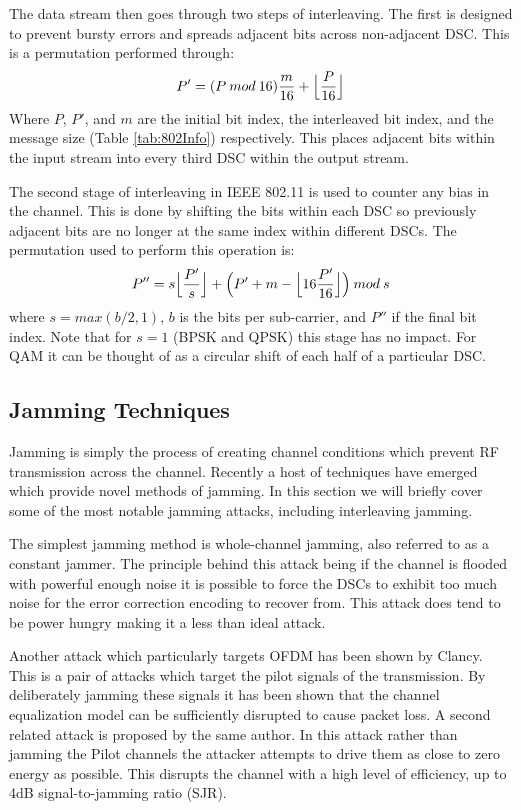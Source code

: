 \documentclass[sigconf]{acmart}
\begin{document}
The data stream then goes through two steps of interleaving. The first is designed to prevent bursty errors and spreads adjacent bits across non-adjacent DSC. This is a permutation performed through:
$$P'=(P\:mod\:16)\frac{m}{16} + \Bigl\lfloor{\frac{P}{16}}\Bigr\rfloor$$
Where $P$, $P'$, and $m$ are the initial bit index, the interleaved bit index, and the message size (Table \ref{tab:802Info}) respectively. This places adjacent bits within the input stream into every third DSC within the output stream\cite{vo2016interleaving}. 

The second stage of interleaving in IEEE 802.11 is used to counter any bias in the channel. This is done by shifting the bits within each DSC so previously adjacent bits are no longer at the same index within different DSCs. The permutation used to perform this operation is:
$$P''= s \Bigl\lfloor \frac{P'}{s} \Bigr\rfloor + \Bigl(P' + m - \Bigl\lfloor 16 \frac{P'}{16} \Bigr\rfloor \Bigr)\: mod \: s$$
where $s=max(b/2, 1)$, $b$ is the bits per sub-carrier, and $P''$ if the final bit index. Note that for $s=1$ (BPSK and QPSK) this stage has no impact. For QAM it can be thought of as a circular shift of each half of a particular DSC. 

\subsection{Jamming Techniques}
\label{sec:jamming}

Jamming is simply the process of creating channel conditions which prevent RF transmission across the channel. Recently a host of techniques have emerged which provide novel methods of jamming. In this section we will briefly cover some of the most notable jamming attacks, including interleaving jamming. 

The simplest jamming method is whole-channel jamming, also referred to as a constant jammer\cite{grover2014jamming}. The principle behind this attack being if the channel is flooded with powerful enough noise it is possible to force the DSCs to exhibit too much noise for the error correction encoding to recover from. This attack does tend to be power hungry making it a less than ideal attack. 

Another attack which particularly targets OFDM has been shown by Clancy\cite{clancy2011efficient}. This is a pair of attacks which target the pilot signals of the transmission. By deliberately jamming these signals it has been shown that the channel equalization model can be sufficiently disrupted to cause packet loss. A second related attack is proposed by the same author. In this attack rather than jamming the Pilot channels the attacker attempts to drive them as close to zero energy as possible. This disrupts the channel with a high level of efficiency, up to 4dB signal-to-jamming ratio (SJR).
\end{document}
